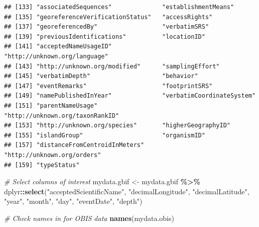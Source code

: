 \documentclass[
]{book}
\newenvironment{Shaded}{\begin{snugshade}}{\end{snugshade}}
\newcommand{\CommentTok}[1]{\textcolor[rgb]{0.56,0.35,0.01}{\textit{#1}}}
\newcommand{\FunctionTok}[1]{\textcolor[rgb]{0.13,0.29,0.53}{\textbf{#1}}}
\newcommand{\NormalTok}[1]{#1}
\newcommand{\OtherTok}[1]{\textcolor[rgb]{0.56,0.35,0.01}{#1}}
\newcommand{\SpecialCharTok}[1]{\textcolor[rgb]{0.81,0.36,0.00}{\textbf{#1}}}
\newcommand{\StringTok}[1]{\textcolor[rgb]{0.31,0.60,0.02}{#1}}
\begin{document}
\begin{verbatim}
## [133] "associatedSequences"              "establishmentMeans"              
## [135] "georeferenceVerificationStatus"   "accessRights"                    
## [137] "georeferencedBy"                  "verbatimSRS"                     
## [139] "previousIdentifications"          "locationID"                      
## [141] "acceptedNameUsageID"              "http://unknown.org/language"     
## [143] "http://unknown.org/modified"      "samplingEffort"                  
## [145] "verbatimDepth"                    "behavior"                        
## [147] "eventRemarks"                     "footprintSRS"                    
## [149] "namePublishedInYear"              "verbatimCoordinateSystem"        
## [151] "parentNameUsage"                  "http://unknown.org/taxonRankID"  
## [153] "http://unknown.org/species"       "higherGeographyID"               
## [155] "islandGroup"                      "organismID"                      
## [157] "distanceFromCentroidInMeters"     "http://unknown.org/orders"       
## [159] "typeStatus"
\end{verbatim}

\begin{Shaded}
\begin{Highlighting}[]
\CommentTok{\# Select columns of interest}
\NormalTok{mydata.gbif }\OtherTok{\textless{}{-}}\NormalTok{ mydata.gbif }\SpecialCharTok{\%\textgreater{}\%}
\NormalTok{                dplyr}\SpecialCharTok{::}\FunctionTok{select}\NormalTok{(}\StringTok{"acceptedScientificName"}\NormalTok{,}
                  \StringTok{"decimalLongitude"}\NormalTok{,}
                  \StringTok{"decimalLatitude"}\NormalTok{,}
                  \StringTok{"year"}\NormalTok{,}
                  \StringTok{"month"}\NormalTok{,}
                  \StringTok{"day"}\NormalTok{,}
                  \StringTok{"eventDate"}\NormalTok{,}
                  \StringTok{"depth"}\NormalTok{)}

\CommentTok{\# Check names in for OBIS data}
\FunctionTok{names}\NormalTok{(mydata.obis)}
\end{Highlighting}
\end{Shaded}
\end{document}

